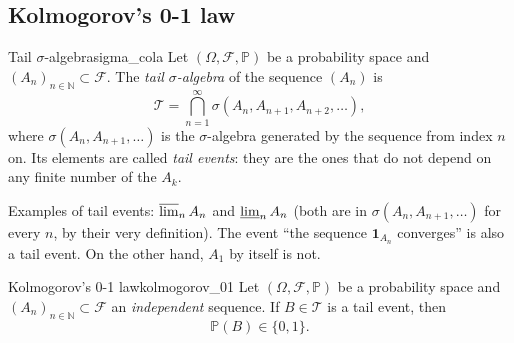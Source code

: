 \documentclass[11pt, a4paper]{article}
\begin{document}
\subsection{Kolmogorov's 0-1 law}

\begin{definicion}{Tail $\sigma$-algebra}{sigma_cola}
Let $(\Omega, \mathcal{F}, \mathbb{P})$ be a probability space and $(A_n)_{n \in \mathbb{N}}
\subset \mathcal{F}$. The \emph{tail $\sigma$-algebra} of the sequence $(A_n)$ is
$$ \mathcal{T} = \bigcap_{n=1}^\infty \sigma(A_n, A_{n+1}, A_{n+2}, \dots), $$
where $\sigma(A_n, A_{n+1}, \dots)$ is the $\sigma$-algebra generated by the sequence from
index $n$ on. Its elements are called \emph{tail events}: they are the ones that do not depend on
any finite number of the $A_k$.
\end{definicion}

\obs Examples of tail events: $\varlimsup_n A_n$ and $\varliminf_n A_n$ (both are in
$\sigma(A_n, A_{n+1}, \dots)$ for every $n$, by their very definition). The event ``the sequence
$\mathbf{1}_{A_n}$ converges'' is also a tail event. On the other hand, $A_1$ by itself is not.

\begin{teorema}{Kolmogorov's 0-1 law}{kolmogorov_01}
Let $(\Omega, \mathcal{F}, \mathbb{P})$ be a probability space and $(A_n)_{n \in \mathbb{N}}
\subset \mathcal{F}$ an \emph{independent} sequence. If $B \in \mathcal{T}$ is a tail
event, then
$$ \mathbb{P}(B) \in \{0, 1\}. $$
\end{teorema}
\end{document}
